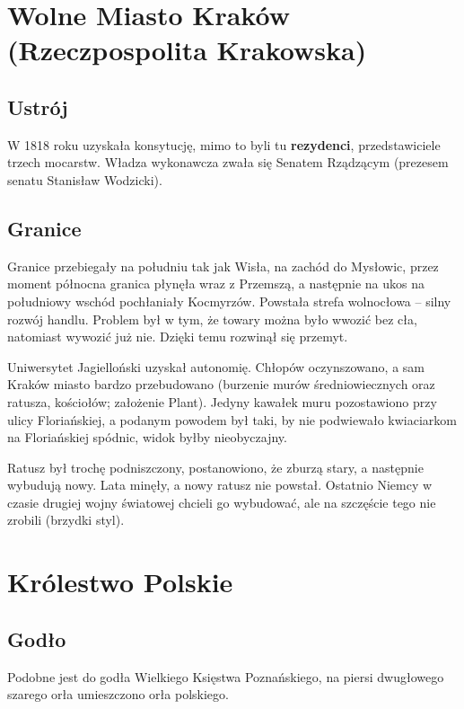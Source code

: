 \documentclass [a4paper, 11pt, oneside]{book}
\begin{document}
    \section{Wolne Miasto Kraków (Rzeczpospolita Krakowska)} %
    \label{sec:wolne_miasto_krak_w_}
        \subsection{Ustrój} %
        \label{sub:ustr_j}
            W 1818 roku uzyskała konsytucję, mimo to byli tu \textbf{rezydenci}, przedstawiciele trzech mocarstw. Władza wykonawcza zwała się Senatem Rządzącym (prezesem senatu Stanisław Wodzicki).
        \subsection{Granice} %
        \label{sec:granice}
            Granice przebiegały na południu tak jak Wisła, na zachód do Mysłowic, przez moment północna granica płynęła wraz z Przemszą, a następnie na ukos na południowy wschód pochłaniały Kocmyrzów. Powstała strefa wolnocłowa -- silny rozwój handlu. Problem był w tym, że towary można było wwozić bez cła, natomiast wywozić już nie. Dzięki temu rozwinął się przemyt.

            Uniwersytet Jagielloński uzyskał autonomię. Chłopów oczynszowano, a sam Kraków miasto bardzo przebudowano (burzenie murów średniowiecznych oraz ratusza, kościołów; założenie Plant). Jedyny kawałek muru pozostawiono przy ulicy Floriańskiej, a podanym powodem był taki, by nie podwiewało kwiaciarkom na Floriańskiej spódnic, widok byłby nieobyczajny.

            Ratusz był trochę podniszczony, postanowiono, że zburzą stary, a następnie wybudują nowy. Lata minęły, a nowy ratusz nie powstał. Ostatnio Niemcy w czasie drugiej wojny światowej chcieli go wybudować, ale na szczęście tego nie zrobili (brzydki styl).
    \section{Królestwo Polskie} %
    \label{sec:kr_lestwo_polskie}
        \subsection{Godło} %
        \label{sub:god_o}
            Podobne jest do godła Wielkiego Księstwa Poznańskiego, na piersi dwugłowego szarego orła umieszczono orła polskiego.
\end{document}
